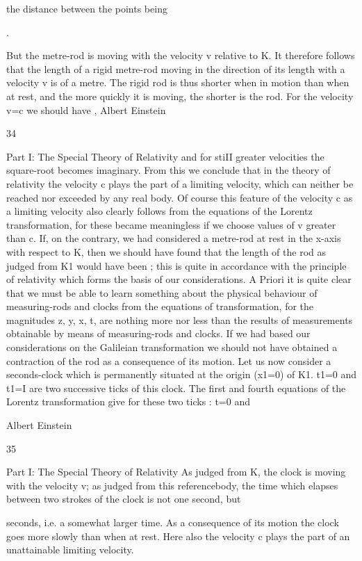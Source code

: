 \documentclass{article}
\begin{document}
the distance between the points being

.

But the metre-rod is moving with the velocity v relative to K. It therefore follows that the
length of a rigid metre-rod moving in the direction of its length with a velocity v is
of a metre.
The rigid rod is thus shorter when in motion than when at rest, and the more quickly it is
moving, the shorter is the rod. For the velocity v=c we should have
,
Albert Einstein

34

Part I: The Special Theory of Relativity
and for stiII greater velocities the square-root becomes imaginary. From this we conclude
that in the theory of relativity the velocity c plays the part of a limiting velocity, which can
neither be reached nor exceeded by any real body.
Of course this feature of the velocity c as a limiting velocity also clearly follows from the
equations of the Lorentz transformation, for these became meaningless if we choose values
of v greater than c.
If, on the contrary, we had considered a metre-rod at rest in the x-axis with respect to K,
then we should have found that the length of the rod as judged from K1 would have been
;
this is quite in accordance with the principle of relativity which forms the basis of our
considerations.
A Priori it is quite clear that we must be able to learn something about the physical
behaviour of measuring-rods and clocks from the equations of transformation, for the
magnitudes z, y, x, t, are nothing more nor less than the results of measurements obtainable
by means of measuring-rods and clocks. If we had based our considerations on the Galileian
transformation we should not have obtained a contraction of the rod as a consequence of its
motion.
Let us now consider a seconds-clock which is permanently situated at the origin (x1=0) of
K1. t1=0 and t1=I are two successive ticks of this clock. The first and fourth equations of the
Lorentz transformation give for these two ticks :
t=0
and

Albert Einstein

35

Part I: The Special Theory of Relativity
As judged from K, the clock is moving with the velocity v; as judged from this referencebody, the time which elapses between two strokes of the clock is not one second, but

seconds, i.e. a somewhat larger time. As a consequence of its motion the clock goes more
slowly than when at rest. Here also the velocity c plays the part of an unattainable limiting
velocity.
\end{document}
